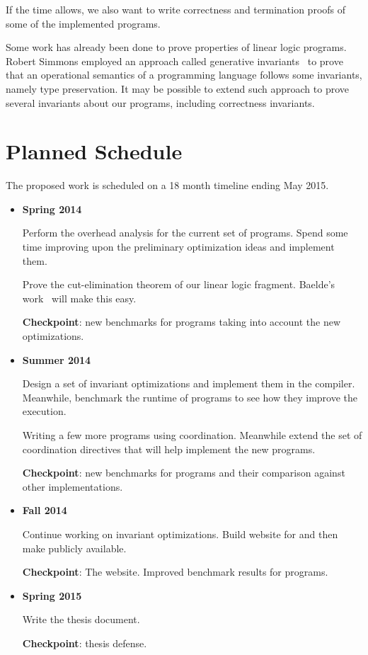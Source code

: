 If the time allows, we also want to write correctness and termination proofs of some of the implemented \lang programs.

Some work has already been done to prove properties of linear logic programs.
Robert Simmons employed an approach called generative invariants~\cite{simmons:Thesis} to prove that an operational semantics of a programming
language follows some invariants, namely type preservation. It may be possible to extend such approach to
prove several invariants about our programs, including correctness invariants.

\section{Planned Schedule}

The proposed work is scheduled on a 18 month timeline ending May 2015.

\begin{itemize}
   \item \textbf{Spring 2014}
      
   Perform the overhead analysis for the current set of \lang programs.
   Spend some time improving upon the preliminary optimization ideas and implement them.

   Prove the cut-elimination theorem of our linear logic fragment. Baelde's work~\cite{Baelde:2012:LGF:2071368.2071370} will make this easy.
   
   \textbf{Checkpoint}: new benchmarks for \lang programs taking into account the new optimizations.

   \item \textbf{Summer 2014}
   
   Design a set of invariant optimizations and implement them in the compiler. Meanwhile, benchmark the runtime of programs to see how they improve the execution.

   Writing a few more programs using coordination.
   Meanwhile extend the set of coordination directives that will help implement the new programs.

   \textbf{Checkpoint}: new benchmarks for \lang programs and their comparison against other implementations.
   
   \item \textbf{Fall 2014}
   
   Continue working on invariant optimizations.
   Build website for \lang and then make \lang publicly available.
   
   \textbf{Checkpoint}: The \lang website. Improved benchmark results for \lang programs.
   
   \item \textbf{Spring 2015}
   
   Write the thesis document.
   
   \textbf{Checkpoint}: thesis defense.

\end{itemize}
